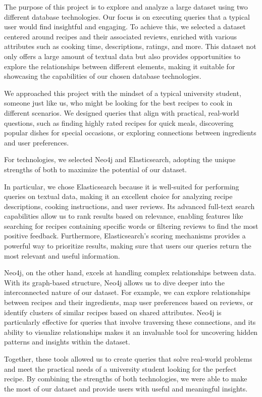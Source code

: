 The purpose of this project is to explore and analyze a large dataset using two different database technologies. Our focus is on executing queries that a typical user would find insightful and engaging. To achieve this, we selected a dataset centered around recipes and their associated reviews, enriched with various attributes such as cooking time, descriptions, ratings, and more. This dataset not only offers a large amount of textual data but also provides opportunities to explore the relationships between different elements, making it suitable for showcasing the capabilities of our chosen database technologies.

We approached this project with the mindset of a typical university student, someone just like us, who might be looking for the best recipes to cook in different scenarios. We designed queries that align with practical, real-world questions, such as finding highly rated recipes for quick meals, discovering popular dishes for special occasions, or exploring connections between ingredients and user preferences.

For technologies, we selected Neo4j and Elasticsearch, adopting the unique strengths of both to maximize the potential of our dataset.

In particular, we chose Elasticsearch because it is well-suited for performing queries on textual data, making it an excellent choice for analyzing recipe descriptions, cooking instructions, and user reviews. Its advanced full-text search capabilities allow us to rank results based on relevance, enabling features like searching for recipes containing specific words or filtering reviews to find the most positive feedback. Furthermore, Elasticsearch’s scoring mechanisms provides a powerful way to prioritize results, making sure that users our queries return the most relevant and useful information. 

Neo4j, on the other hand, excels at handling complex relationships between data. With its graph-based structure, Neo4j allows us to dive deeper into the interconnected nature of our dataset. For example, we can explore relationships between recipes and their ingredients, map user preferences based on reviews, or identify clusters of similar recipes based on shared attributes. Neo4j is particularly effective for queries that involve traversing these connections, and its ability to visualize relationships makes it an invaluable tool for uncovering hidden patterns and insights within the dataset.

Together, these tools allowed us to create queries that solve real-world problems and meet the practical needs of a university student looking for the perfect recipe. By combining the strengths of both technologies, we were able to make the most of our dataset and provide users with useful and meaningful insights.